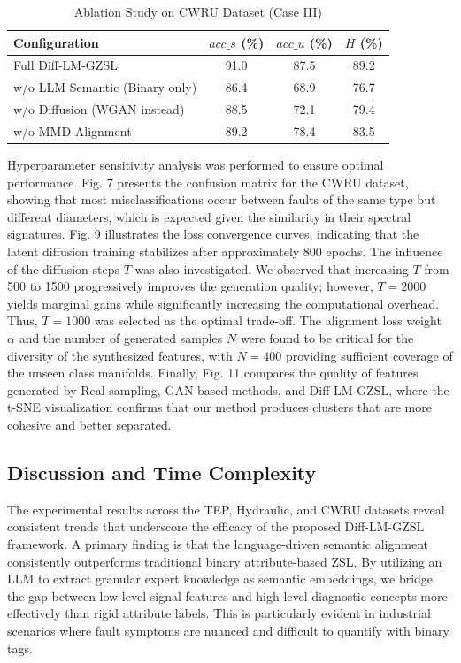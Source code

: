 \begin{table}[ht]
\centering
\caption{Ablation Study on CWRU Dataset (Case III)}
\label{tab:cwru_ablation}
\begin{tabular}{lccc}
\hline
Configuration & $acc\_s$ (\%) & $acc\_u$ (\%) & $H$ (\%) \\ \hline
Full Diff-LM-GZSL & 91.0 & 87.5 & 89.2 \\
w/o LLM Semantic (Binary only) & 86.4 & 68.9 & 76.7 \\
w/o Diffusion (WGAN instead) & 88.5 & 72.1 & 79.4 \\
w/o MMD Alignment & 89.2 & 78.4 & 83.5 \\
\hline
\end{tabular}
\end{table}

Hyperparameter sensitivity analysis was performed to ensure optimal performance. Fig. 7 presents the confusion matrix for the CWRU dataset, showing that most misclassifications occur between faults of the same type but different diameters, which is expected given the similarity in their spectral signatures. Fig. 9 illustrates the loss convergence curves, indicating that the latent diffusion training stabilizes after approximately 800 epochs. The influence of the diffusion steps $T$ was also investigated. We observed that increasing $T$ from 500 to 1500 progressively improves the generation quality; however, $T=2000$ yields marginal gains while significantly increasing the computational overhead. Thus, $T=1000$ was selected as the optimal trade-off. The alignment loss weight $\alpha$ and the number of generated samples $N$ were found to be critical for the diversity of the synthesized features, with $N=400$ providing sufficient coverage of the unseen class manifolds. Finally, Fig. 11 compares the quality of features generated by Real sampling, GAN-based methods, and Diff-LM-GZSL, where the t-SNE visualization confirms that our method produces clusters that are more cohesive and better separated.

\subsection{Discussion and Time Complexity}
The experimental results across the TEP, Hydraulic, and CWRU datasets reveal consistent trends that underscore the efficacy of the proposed Diff-LM-GZSL framework. A primary finding is that the language-driven semantic alignment consistently outperforms traditional binary attribute-based ZSL. By utilizing an LLM to extract granular expert knowledge as semantic embeddings, we bridge the gap between low-level signal features and high-level diagnostic concepts more effectively than rigid attribute labels. This is particularly evident in industrial scenarios where fault symptoms are nuanced and difficult to quantify with binary tags. 

